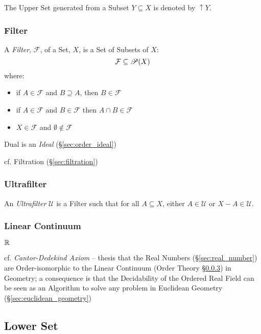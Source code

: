 The Upper Set generated from a Subset $Y \subseteq X$ is denoted by
$\uparrow Y$.



\subsubsection{Filter}\label{sec:filter}

A \emph{Filter}, $\mathcal{F}$, of a Set, $X$, is a Set of Subsets of
$X$:
\[
  \mathcal{F} \subseteq \mathscr{P}(X)
\]
where:
\begin{itemize}
\item if $A \in \mathcal{F}$ and $B \supseteq A$, then $B \in
  \mathcal{F}$
\item if $A \in \mathcal{F}$ and $B \in \mathcal{F}$ then $A \cap B
  \in \mathcal{F}$
\item $X \in \mathcal{F}$ and $\emptyset \notin \mathcal{F}$
\end{itemize}

Dual is an \emph{Ideal} (\S\ref{sec:order_ideal})

cf. Filtration (\S\ref{sec:filtration})



\subsubsection{Ultrafilter}\label{sec:ultrafilter}

An \emph{Ultrafilter} $\mathcal{U}$ is a Filter such that for all $A
\subseteq X$, either $A \in \mathcal{U}$ or $X - A \in \mathcal{U}$.



\subsubsection{Linear Continuum}\label{sec:linear_continuum}

$\mathbb{R}$

cf. \emph{Cantor-Dedekind Axiom} -- thesis that the Real Numbers
(\S\ref{sec:real_number}) are Order-isomorphic to the Linear Continuum (Order
Theory \S\ref{sec:linear_continuum}) in Geometry; a consequence is that the
Decidability of the Ordered Real Field can be seen as an Algorithm to solve any
problem in Euclidean Geometry (\S\ref{sec:euclidean_geometry})



\subsection{Lower Set}\label{sec:lower_set}

